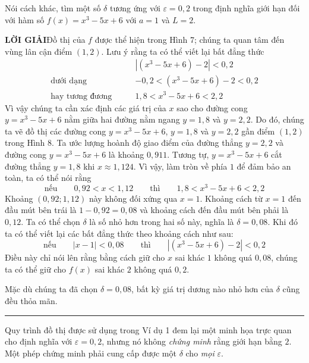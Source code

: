 \begin{minipage}[t]{385pt}
  \setlength{\parindent}{14pt}
  \noindent
  Nói cách khác, tìm một số $\delta$ tương ứng với $\varepsilon = 0{,}2$ trong định nghĩa giới hạn đối với hàm số $f(x) = x^3 - 5x + 6$ với $a = 1$ và $L = 2$.

  \vspace{6pt}
  \noindent
  \textbf{\textsf{\color{stewartblue}LỜI GIẢI}}\quad Đồ thị của $f$ được thể hiện trong Hình 7; chúng ta quan tâm đến vùng lân cận điểm $(1, 2)$. Lưu ý rằng ta có thể viết lại bất đẳng thức
  \begin{align*}
    & |(x^3 - 5x + 6) - 2| < 0{,}2 \\
    \text{dưới dạng}\qquad & -0{,}2 < (x^3 - 5x + 6) - 2 < 0{,}2 \\
    \text{hay tương đương}\qquad & 1{,}8 < x^3 - 5x + 6 < 2{,}2
  \end{align*}
  Vì vậy chúng ta cần xác định các giá trị của $x$ sao cho đường cong $y = x^3 - 5x + 6$ nằm giữa hai đường nằm ngang $y = 1{,}8$ và $y = 2{,}2$. Do đó, chúng ta vẽ đồ thị các đường cong $y = x^3 - 5x + 6$, $y = 1{,}8$ và $y = 2{,}2$ gần điểm $(1, 2)$ trong Hình 8. Ta ước lượng hoành độ giao điểm của đường thẳng $y = 2{,}2$ và đường cong $y = x^3 - 5x + 6$ là khoảng $0{,}911$. Tương tự, $y = x^3 - 5x + 6$ cắt đường thẳng $y = 1{,}8$ khi $x \approx 1{,}124$. Vì vậy, làm tròn về phía $1$ để đảm bảo an toàn, ta có thể nói rằng
  \[
    \text{nếu}\qquad 0{,}92 < x < 1{,}12 \qquad\text{thì}\qquad 1{,}8 < x^3 - 5x + 6 < 2{,}2
  \]
  Khoảng $(0{,}92; 1{,}12)$ này không đối xứng qua $x = 1$. Khoảng cách từ $x = 1$ đến đầu mút bên trái là $1 - 0{,}92 = 0{,}08$ và khoảng cách đến đầu mút bên phải là $0{,}12$. Ta có thể chọn $\delta$ là số nhỏ hơn trong hai số này, nghĩa là $\delta = 0{,}08$. Khi đó ta có thể viết lại các bất đẳng thức theo khoảng cách như sau:
  \[
    \text{nếu}\qquad |x - 1| < 0{,}08 \qquad\text{thì}\qquad |(x^3 - 5x + 6) - 2| < 0{,}2
  \]
  Điều này chỉ nói lên rằng bằng cách giữ cho $x$ sai khác $1$ không quá $0{,}08$, chúng ta có thể giữ cho $f(x)$ sai khác $2$ không quá $0{,}2$.

  Mặc dù chúng ta đã chọn $\delta = 0{,}08$, bất kỳ giá trị dương nào nhỏ hơn của $\delta$ cũng đều thỏa mãn.\hfill\textcolor{stewartblue}{\rule{1.1ex}{1.1ex}}

  \vspace{6pt}
  Quy trình đồ thị được sử dụng trong Ví dụ 1 đem lại một minh họa trực quan cho định nghĩa với $\varepsilon = 0{,}2$, nhưng nó không \textit{chứng minh} rằng giới hạn bằng $2$. Một phép chứng minh phải cung cấp được một $\delta$ cho \textit{mọi} $\varepsilon$.


\end{minipage}
